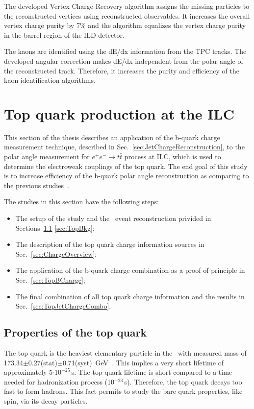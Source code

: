 The developed Vertex Charge Recovery algorithm assigns the missing particles to the reconstructed vertices using reconstructed observables. It increases the overall vertex charge purity by 7\% and the algorithm equalizes the vertex charge purity in the barrel region of the ILD detector. 

The kaons are identified using the dE/dx information from the TPC tracks. The developed angular correction makes dE/dx independent from the polar angle of the reconstructed track. Therefore, it increases the purity and efficiency of the kaon identification algorithms. 



\newpage
\section{Top quark production at the ILC}
\label{sec:TopProduction}
This section of the thesis describes an application of the b-quark charge measurement technique, described in Sec.~\ref{sec:JetChargeReconstruction}, to the polar angle measurement for $e^+e^- \to t\bar{t}$ process at ILC, which is used to determine the electroweak couplings of the top quark.
The end goal of this study is to increase efficiency of the b-quark polar angle reconstruction as comparing to the previous studies~\cite{bib:ILCTOP}.

The studies in this section have the following steps:
\begin{itemize}
	\item The setup of the study and the \ttbar\ event reconstruction privided in Sections~\ref{sec:TopProp}-\ref{sec:TopBkg};
	\item The description of the top quark charge information sources in Sec.~\ref{sec:ChargeOverview};
	\item The application of the b-quark charge combination as a proof of principle in Sec.~\ref{sec:TopBCharge};
	\item The final combination of all top quark charge information and the results in Sec.~\ref{sec:TopJetChargeCombo}.
\end{itemize}

\subsection{Properties of the top quark}
\label{sec:TopProp}
The top quark is the heaviest elementary particle in the \sm\ with measured mass of 173.34$\pm$0.27(stat)$\pm$0.71(syst) \,GeV~\cite{bib:TopMass}. This implies a very short lifetime of approximately 5$\cdot10^{-25}$\,s.
The top quark lifetime is short compared to a time needed for hadronization process  (10$^{-23}$\,s). Therefore, the top quark decays too fast to form hadrons. 
This fact permits to study the bare quark properties, like spin, via its decay particles. 


